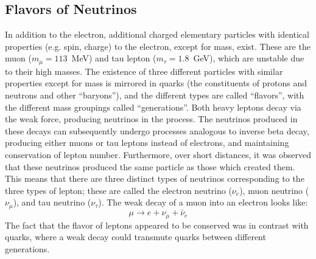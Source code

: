 \documentclass[/main.tex]{subfiles}
\begin{document}
\subsection{Flavors of Neutrinos}
In addition to the electron, additional charged elementary particles with identical properties (e.g. spin, charge) to the electron, except for mass, exist\cite{PDG2018}.
These are the muon ($m_\mu=113$~MeV) and tau lepton ($m_\tau=1.8$~GeV), which are unstable due to their high masses.
The existence of three different particles with similar properties except for mass is mirrored in quarks (the constituents of protons and neutrons and other ``baryons''), and the different types are called ``flavors'', with the different mass groupings called ``generations''.
Both heavy leptons decay via the weak force, producing neutrinos in the process.
The neutrinos produced in these decays can subsequently undergo processes analogous to inverse beta decay, producing either muons or tau leptons instead of electrons, and maintaining conservation of lepton number.
Furthermore, over short distances, it was observed that these neutrinos produced the same particle as those which created them.
This means that there are three distinct types of neutrinos corresponding to the three types of lepton; these are called the electron neutrino ($\nu_e$), muon neutrino ($\nu_\mu$), and tau neutrino ($\nu_\tau$).
The weak decay of a muon into an electron looks like:
\begin{equation}
  \mu \rightarrow e + \nu_\mu + \bar \nu_e
\end{equation}
The fact that the flavor of leptons appeared to be conserved was in contrast with quarks, where a weak decay could transmute quarks between different generations.
\end{document}
